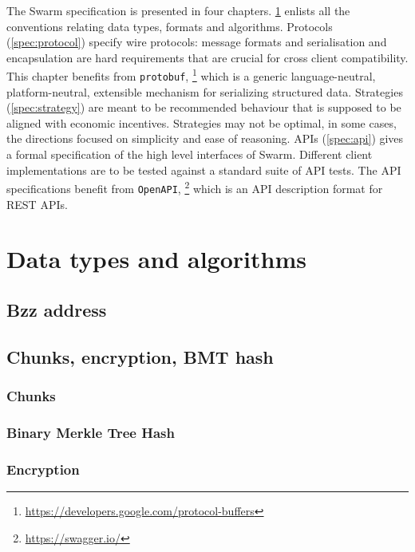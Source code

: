 
The Swarm specification is presented in four chapters. \ref{spec:convention} enlists all the conventions relating data types, formats and algorithms. Protocols 
(\ref{spec:protocol}) specify wire protocols: message formats and serialisation and encapsulation are hard requirements that are crucial for  cross client compatibility. This chapter benefits from \lstinline{protobuf},%
%
\footnote{\url{https://developers.google.com/protocol-buffers}}
%
which is a generic language-neutral, platform-neutral, extensible mechanism for serializing structured data.
Strategies (\ref{spec:strategy}) are meant to be recommended  behaviour that is supposed to be aligned with economic incentives.
Strategies may not be optimal, in some cases, the directions focused on simplicity and ease of reasoning.
APIs (\ref{spec:api}) gives a formal specification of the high level interfaces of Swarm. Different client implementations are  to be tested against a standard suite of API tests. The API specifications benefit from \lstinline{OpenAPI},%
%
\footnote{\url{https://swagger.io/}}
%
which is an API description format for REST APIs.


\chapter{Data types and algorithms}\label{spec:convention}

\orange{}
\section{Bzz address}\label{spec:format:bzzaddress}


\section{Chunks, encryption, BMT hash}
\subsection{Chunks \statusyellow}\label{spec:format:chunks}

\subsection{Binary Merkle Tree Hash \statusyellow}\label{spec:format:bmt}

\subsection{Encryption \statusyellow}\label{spec:format:encryption}


